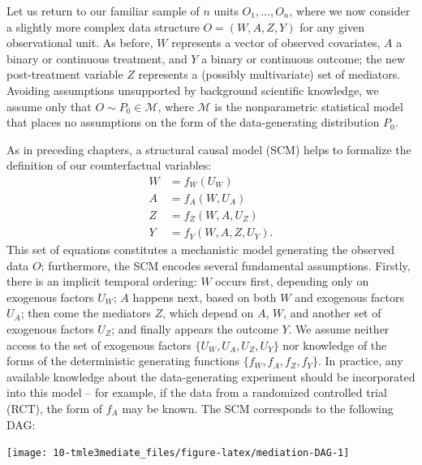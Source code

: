 \documentclass[
  12pt, krantz2,
]{krantz}
\newcommand{\M}{\mathcal{M}}
\newcommand{\1}{\mathbbm{1}}
\theoremstyle{definition}
\theoremstyle{definition}
\theoremstyle{definition}
\theoremstyle{definition}
\theoremstyle{remark}
\begin{document}
Let us return to our familiar sample of \(n\) units \(O_1, \ldots, O_n\), where we
now consider a slightly more complex data structure \(O = (W, A, Z, Y)\) for any
given observational unit. As before, \(W\) represents a vector of observed
covariates, \(A\) a binary or continuous treatment, and \(Y\) a binary or continuous
outcome; the new post-treatment variable \(Z\) represents a (possibly
multivariate) set of mediators. Avoiding assumptions unsupported by background
scientific knowledge, we assume only that \(O \sim P_0 \in \M\), where \(\M\) is the
nonparametric statistical model that places no assumptions on the form of the
data-generating distribution \(P_0\).

As in preceding chapters, a structural causal model (SCM) \citep{pearl2009causality}
helps to formalize the definition of our counterfactual variables:
\begin{align}
  W &= f_W(U_W) \\ \nonumber
  A &= f_A(W, U_A) \\ \nonumber
  Z &= f_Z(W, A, U_Z) \\ \nonumber
  Y &= f_Y(W, A, Z, U_Y).
  \label{eq:npsem-mediate}
\end{align}
This set of equations
constitutes a mechanistic model generating the observed data \(O\); furthermore,
the SCM encodes several fundamental assumptions. Firstly, there is an implicit
temporal ordering: \(W\) occurs first, depending only on exogenous factors \(U_W\);
\(A\) happens next, based on both \(W\) and exogenous factors \(U_A\); then come the
mediators \(Z\), which depend on \(A\), \(W\), and another set of exogenous factors
\(U_Z\); and finally appears the outcome \(Y\). We assume neither access to the set
of exogenous factors \(\{U_W, U_A, U_Z, U_Y\}\) nor knowledge of the forms of the
deterministic generating functions \(\{f_W, f_A, f_Z, f_Y\}\). In practice, any
available knowledge about the data-generating experiment should be incorporated
into this model -- for example, if the data from a randomized controlled trial
(RCT), the form of \(f_A\) may be known. The SCM corresponds to the following DAG:

\begin{center}\texttt{[image: 10-tmle3mediate\_files/figure-latex/mediation-DAG-1]} \end{center}
\end{document}
